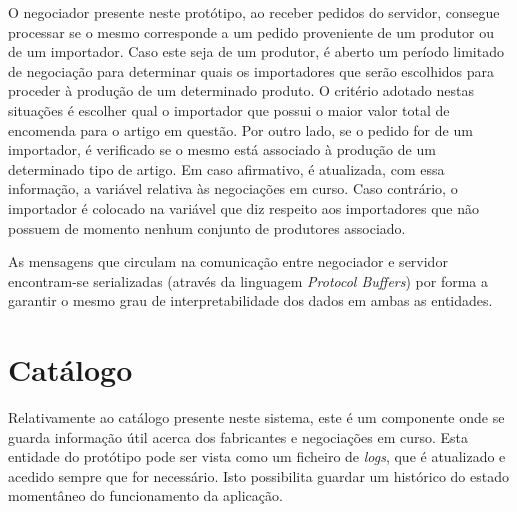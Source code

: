 \documentclass[a4paper]{report}
\begin{document}
	O negociador presente neste protótipo, ao receber pedidos do servidor, consegue processar se o mesmo corresponde a um pedido proveniente de um produtor ou de um importador.
	Caso este seja de um produtor, é aberto um período limitado de negociação para determinar quais os importadores que serão escolhidos para proceder à produção de um determinado produto. O critério adotado nestas situações 
	é escolher qual o importador que possui o maior valor total de encomenda para o artigo em questão.
	Por outro lado, se o pedido for de um importador, é verificado se o mesmo está associado à produção de um determinado tipo de artigo. Em caso afirmativo, é atualizada, com essa informação, a variável relativa às negociações
	em curso. Caso contrário, o importador é colocado na variável que diz respeito aos importadores que não possuem de momento nenhum conjunto de produtores associado. 

	As mensagens que circulam na comunicação entre negociador e servidor encontram-se serializadas (através da linguagem \textit{Protocol Buffers}) por forma a garantir o mesmo grau de interpretabilidade dos dados em ambas as entidades.

	\section{Catálogo}
	Relativamente ao catálogo presente neste sistema, este é um componente onde se guarda informação útil acerca dos fabricantes e negociações em curso. Esta entidade do protótipo pode ser vista como um ficheiro de \textit{logs}, que é 
	atualizado e acedido sempre que for necessário. Isto possibilita guardar um histórico do estado momentâneo do funcionamento da aplicação.
\end{document}
